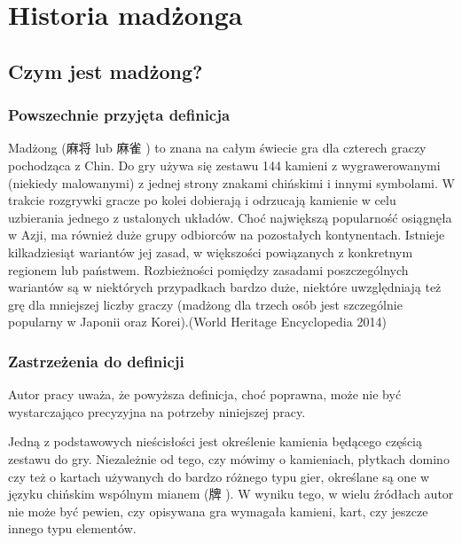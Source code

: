 \chapter{Historia madżonga}
\section{Czym jest madżong?}
\subsection{Powszechnie przyjęta definicja}
Madżong (麻将  lub 麻雀 ) to znana na całym świecie
gra dla czterech graczy pochodząca z Chin. Do gry używa się zestawu 144 kamieni
z wygrawerowanymi (niekiedy malowanymi) z jednej strony znakami chińskimi i
innymi symbolami. W trakcie rozgrywki gracze po kolei dobierają i odrzucają
kamienie w celu uzbierania jednego z ustalonych układów. Choć największą
popularność osiągnęła w Azji, ma również duże grupy odbiorców na pozostałych
kontynentach.
Istnieje kilkadziesiąt wariantów jej zasad, w większości powiązanych z
konkretnym regionem lub państwem. Rozbieżności pomiędzy zasadami poszczególnych
wariantów są w niektórych przypadkach bardzo duże, niektóre uwzględniają też grę
dla mniejszej liczby graczy (madżong dla trzech osób jest szczególnie popularny
w Japonii oraz Korei).(World Heritage Encyclopedia 2014)
\subsection{Zastrzeżenia do definicji}
Autor pracy uważa, że powyższa definicja, choć poprawna, może nie być
wystarczająco precyzyjna na potrzeby niniejszej pracy.

Jedną z podstawowych nieścisłości jest określenie kamienia będącego częścią
zestawu do gry.
Niezależnie od tego, czy mówimy o kamieniach, płytkach domino czy też o kartach
używanych do bardzo różnego typu gier, określane są one w języku chińskim
wspólnym mianem  (牌 ). W wyniku tego, w wielu źródłach
autor nie może być pewien, czy opisywana gra wymagała kamieni, kart, czy jeszcze
innego typu elementów.

